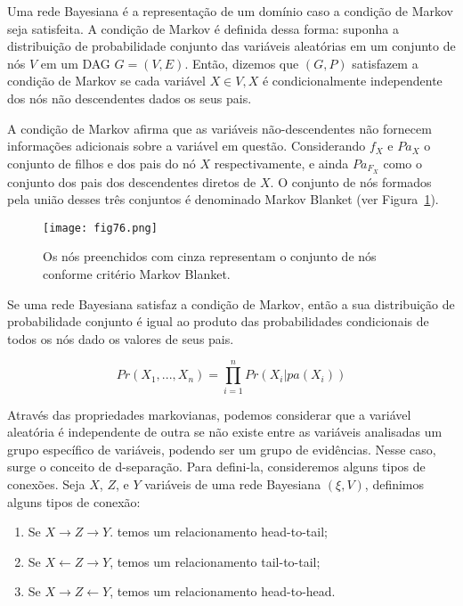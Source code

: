 Uma rede Bayesiana é a representação de um domínio caso a condição de Markov seja satisfeita. A condição de Markov é definida dessa forma: suponha a distribuição de probabilidade conjunto das variáveis aleatórias em um conjunto de nós $V$ em um DAG $G = (V, E)$. Então, dizemos que $(G, P)$ satisfazem a condição de Markov se cada variável $X \in V, X$ é condicionalmente independente dos nós não descendentes dados os seus pais.

A condição de Markov afirma que as variáveis não-descendentes não fornecem informações adicionais sobre a variável em questão. Considerando $f_X$ e $Pa_X$ o conjunto de filhos e dos pais do nó $X$ respectivamente, e ainda $Pa_{F_{X}}$ como o conjunto dos pais dos descendentes diretos de $X$. O conjunto de nós formados pela união desses três conjuntos é denominado Markov Blanket (ver Figura~\ref{fig:fig76}).

\begin{figure}[t]
    \texttt{[image: fig76.png]}
    \centering
    \caption{Os nós preenchidos com cinza representam o conjunto de nós conforme critério Markov Blanket.}
    \label{fig:fig76}
\end{figure}

Se uma rede Bayesiana satisfaz a condição de Markov, então a sua distribuição de probabilidade conjunto é igual ao produto das probabilidades condicionais de todos os nós dado os valores de seus pais.

\begin{equation}
    Pr(X_1, ..., X_n) = \prod_{i=1}^{n}{Pr(X_i | pa(X_i))}
\end{equation}

Através das propriedades markovianas, podemos considerar que a variável aleatória é independente de outra se não existe entre as variáveis analisadas um grupo específico de variáveis, podendo ser um grupo de evidências. Nesse caso, surge o conceito de d-separação. Para defini-la, consideremos alguns tipos de conexões. Seja $X$, $Z$, e $Y$ variáveis de uma rede Bayesiana $(\xi, V)$, definimos alguns tipos de conexão:

\begin{enumerate}
    \item Se $X \rightarrow Z \rightarrow Y$. temos um relacionamento head-to-tail;
    \item Se $X \leftarrow Z \rightarrow Y$, temos um relacionamento tail-to-tail;
    \item Se $X \rightarrow Z \leftarrow Y$, temos um relacionamento head-to-head.
\end{enumerate}

